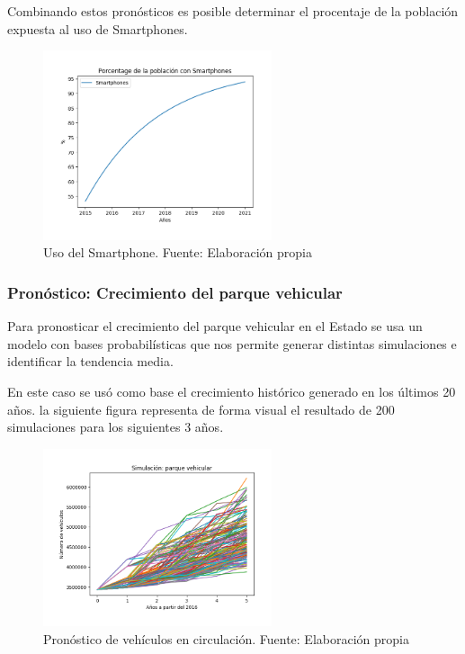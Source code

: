 \documentclass{article}
\begin{document}
Combinando estos pronósticos es posible determinar el procentaje de la población expuesta al
uso de Smartphones.

	\begin{figure}[H]\centering
	\includegraphics[width=0.6\textwidth]{resources/img/smartphone_usage.png}
	\caption{\label{fig:smart_usage} Uso del Smartphone. Fuente: Elaboración propia}
    \end{figure}

\subsubsection{Pronóstico: Crecimiento del parque vehicular}

Para pronosticar el crecimiento del parque vehicular en el Estado se usa
un modelo con bases probabilísticas que nos permite generar distintas
simulaciones e identificar la tendencia media.

En este caso se usó como base el crecimiento histórico generado en los
últimos 20 años. la siguiente figura representa de forma visual el
resultado de 200 simulaciones para los siguientes 3 años.

	\begin{figure}[H]\centering
	\includegraphics[width=0.6\textwidth]{resources/img/vehicle_forecast_img.png}
	\caption{\label{fig:vehicle_forecast} Pronóstico de vehículos en circulación. Fuente: Elaboración propia}
    \end{figure}
\end{document}
